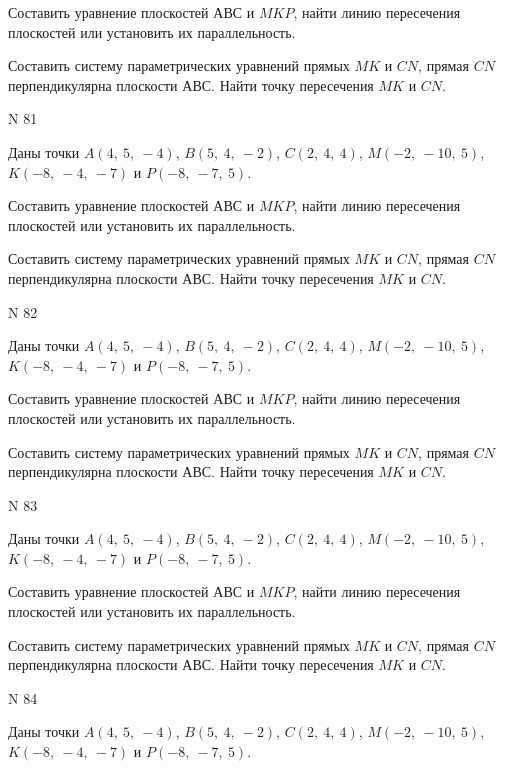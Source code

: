 \documentclass[11pt]{report}
\begin{document}
Составить уравнение плоскостей $АВС$ и $MKP$,
найти линию пересечения плоскостей или установить их параллельность.

Составить систему параметрических уравнений прямых $MK$ и $CN$,
прямая $CN$ перпендикулярна плоскости $АВС$. 
Найти точку пересечения $MK$ и $CN$.



 N 81

Даны точки $A\left( 4, \  5, \  -4\right)$, $B\left( 5, \  4, \  -2\right)$, $C\left( 2, \  4, \  4\right)$, $M\left( -2, \  -10, \  5\right)$, $K\left( -8, \  -4, \  -7\right)$ и $P\left( -8, \  -7, \  5\right)$.


Составить уравнение плоскостей $АВС$ и $MKP$,
найти линию пересечения плоскостей или установить их параллельность.

Составить систему параметрических уравнений прямых $MK$ и $CN$,
прямая $CN$ перпендикулярна плоскости $АВС$. 
Найти точку пересечения $MK$ и $CN$.



 N 82

Даны точки $A\left( 4, \  5, \  -4\right)$, $B\left( 5, \  4, \  -2\right)$, $C\left( 2, \  4, \  4\right)$, $M\left( -2, \  -10, \  5\right)$, $K\left( -8, \  -4, \  -7\right)$ и $P\left( -8, \  -7, \  5\right)$.


Составить уравнение плоскостей $АВС$ и $MKP$,
найти линию пересечения плоскостей или установить их параллельность.

Составить систему параметрических уравнений прямых $MK$ и $CN$,
прямая $CN$ перпендикулярна плоскости $АВС$. 
Найти точку пересечения $MK$ и $CN$.



 N 83

Даны точки $A\left( 4, \  5, \  -4\right)$, $B\left( 5, \  4, \  -2\right)$, $C\left( 2, \  4, \  4\right)$, $M\left( -2, \  -10, \  5\right)$, $K\left( -8, \  -4, \  -7\right)$ и $P\left( -8, \  -7, \  5\right)$.


Составить уравнение плоскостей $АВС$ и $MKP$,
найти линию пересечения плоскостей или установить их параллельность.

Составить систему параметрических уравнений прямых $MK$ и $CN$,
прямая $CN$ перпендикулярна плоскости $АВС$. 
Найти точку пересечения $MK$ и $CN$.



 N 84

Даны точки $A\left( 4, \  5, \  -4\right)$, $B\left( 5, \  4, \  -2\right)$, $C\left( 2, \  4, \  4\right)$, $M\left( -2, \  -10, \  5\right)$, $K\left( -8, \  -4, \  -7\right)$ и $P\left( -8, \  -7, \  5\right)$.
\end{document}
